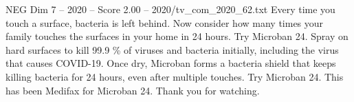 \begin{textsample}{NEG Dim 7 – 2020 – Score 2.00 – 2020/tv\_com\_2020\_62.txt}  \label{ex:f7_neg_016}
Every time you touch a surface, bacteria is left behind.
Now consider how many times your family touches the surfaces in your home in 24 hours.
Try Microban 24.
Spray on hard surfaces to kill 99.9 \% of viruses and bacteria initially, including the virus that causes COVID-19.
Once dry, Microban forms a bacteria shield that keeps killing bacteria for 24 hours, even after multiple touches.
Try Microban 24.
This has been Medifax for Microban 24.
Thank you for watching.

\end{textsample}
